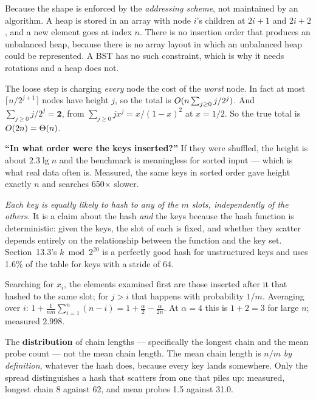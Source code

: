 \begin{ans}
  \item Because the shape is enforced by the \emph{addressing scheme}, not
        maintained by an algorithm. A heap is stored in an array with node $i$'s
        children at $2i+1$ and $2i+2$, and a new element goes at index $n$.
        There is no insertion order that produces an unbalanced heap, because
        there is no array layout in which an unbalanced heap could be
        represented. A BST has no such constraint, which is why it needs
        rotations and a heap does not.
  \item The loose step is charging \emph{every} node the cost of the
        \emph{worst} node. In fact at most $\lceil n/2^{j+1}\rceil$ nodes have
        height $j$, so the total is
        $O(n\sum_{j\ge0} j/2^{j})$. And
        $\sum_{j \ge 0} j/2^{j} = \mathbf{2}$, from
        $\sum_{j\ge0} jx^{j} = x/(1-x)^{2}$ at $x = 1/2$. So the true total is
        $O(2n) = \Theta(n)$.
  \item \textbf{``In what order were the keys inserted?''} If they were
        shuffled, the height is about $2.3\lg n$ and the benchmark is
        meaningless for sorted input --- which is what real data often is.
        Measured, the same keys in sorted order gave height exactly $n$ and
        searches 650$\times$ slower.
\end{ans}

\begin{ans}
  \item \emph{Each key is equally likely to hash to any of the $m$ slots,
        independently of the others.} It is a claim about the hash \emph{and}
        the keys because the hash function is deterministic: given the keys,
        the slot of each is fixed, and whether they scatter depends entirely on
        the relationship between the function and the key set. Section~13.3's
        $k \bmod 2^{20}$ is a perfectly good hash for unstructured keys and
        uses 1.6\% of the table for keys with a stride of 64.
  \item Searching for $x_{i}$, the elements examined first are those inserted
        after it that hashed to the same slot; for $j > i$ that happens with
        probability $1/m$. Averaging over $i$:
        $1 + \frac{1}{nm}\sum_{i=1}^{n}(n-i) = 1 + \frac{\alpha}{2} -
        \frac{\alpha}{2n}$. At $\alpha = 4$ this is $1 + 2 = 3$ for large $n$;
        measured $\mathbf{2.998}$.
  \item The \textbf{distribution} of chain lengths --- specifically the longest
        chain and the mean probe count --- not the mean chain length. The mean
        chain length is $n/m$ \emph{by definition}, whatever the hash does,
        because every key lands somewhere. Only the spread distinguishes a hash
        that scatters from one that piles up: measured, longest chain 8 against
        62, and mean probes 1.5 against 31.0.
\end{ans}

